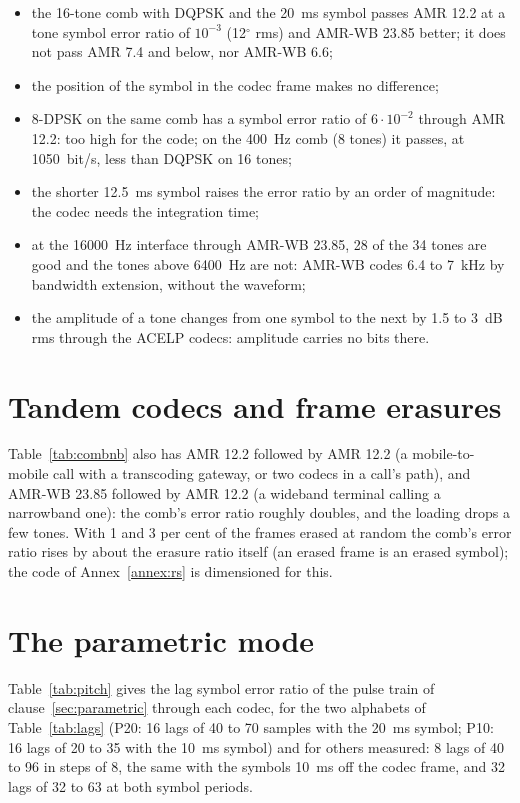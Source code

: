 \begin{itemize}
\item the 16-tone comb with DQPSK and the 20~ms symbol passes AMR 12.2 at a
  tone symbol error ratio of $10^{-3}$ (12$^\circ$ rms) and AMR-WB 23.85
  better; it does not pass AMR 7.4 and below, nor AMR-WB 6.6;
\item the position of the symbol in the codec frame makes no difference;
\item 8-DPSK on the same comb has a symbol error ratio of $6 \cdot 10^{-2}$
  through AMR 12.2: too high for the code; on the 400~Hz comb (8 tones)
  it passes, at 1050~bit/s, less than DQPSK on 16 tones;
\item the shorter 12.5~ms symbol raises the error ratio by an order of
  magnitude: the codec needs the integration time;
\item at the 16000~Hz interface through AMR-WB 23.85, 28 of the 34 tones
  are good and the tones above 6400~Hz are not: AMR-WB codes 6.4 to
  7~kHz by bandwidth extension, without the waveform;
\item the amplitude of a tone changes from one symbol to the next by
  1.5 to 3~dB rms through the ACELP codecs: amplitude carries no bits
  there.
\end{itemize}

\section{Tandem codecs and frame erasures}
Table~\ref{tab:combnb} also has AMR 12.2 followed by AMR 12.2 (a
mobile-to-mobile call with a transcoding gateway, or two codecs in a
call's path), and AMR-WB 23.85 followed by AMR 12.2 (a wideband terminal
calling a narrowband one): the comb's error ratio roughly doubles, and
the loading drops a few tones.  With 1 and 3 per cent of the frames
erased at random the comb's error ratio rises by about the erasure ratio
itself (an erased frame is an erased symbol); the code of
Annex~\ref{annex:rs} is dimensioned for this.

\section{The parametric mode}\label{sec:pitchmeas}
Table~\ref{tab:pitch} gives the lag symbol error ratio of the pulse
train of clause~\ref{sec:parametric} through each codec, for the two
alphabets of Table~\ref{tab:lags} (P20: 16 lags of 40 to 70 samples with
the 20~ms symbol; P10: 16 lags of 20 to 35 with the 10~ms symbol) and
for others measured: 8 lags of 40 to 96 in steps of 8, the same with the
symbols 10~ms off the codec frame, and 32 lags of 32 to 63 at both
symbol periods.

